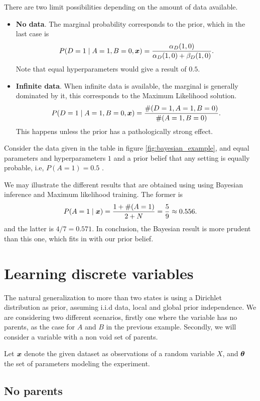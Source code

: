 There are two limit possibilities depending on the amount of data available.
\begin{itemize}
  \item \textbf{No data}. The marginal probability corresponds to the prior, which
in the last case is
    \[
    P(D = 1 \mid A = 1, B = 0, \bm{x}) = \frac{\alpha_{D}(1,0)}{\alpha_{D}(1,0) + \beta_{D}(1,0)}.
    \]
    Note that equal hyperparameters would give a result of \(0.5\).\newline
   
  \item \textbf{Infinite data}. When infinite data is available, the marginal is generally dominated by it,
    this corresponds to the Maximum Likelihood solution.
    \[
    P(D = 1 \mid A = 1, B = 0, \bm{x}) = \frac{\#(D = 1, A = 1 , B = 0)}{\#(A = 1, B = 0)}.
    \]
    This happens unless the prior has a pathologically strong effect.
\end{itemize}

 Consider the data given in the table in figure \ref{fig:bayesian_example}, and
 equal parameters and hyperparameters \(1\) and a prior belief that any setting is equally probable, i.e, \( P(A=1) = 0.5\) . 
 
 We may illustrate the different results that are obtained using using Bayesian inference and Maximum likelihood training. The former is
 \[
   P(A = 1 \mid \bm{x}) = \frac{1 + \#(A = 1)}{2 + N} = \frac{5}{9} \approx 0.556.
 \]
 and the latter is \(4/7 = 0.571\). In conclusion, the Bayesian
 result is more prudent than this one, which fits in with our prior belief.

 \section{Learning discrete variables}

 The natural generalization to more than two states is using a Dirichlet
 distribution as prior, assuming i.i.d data, local and global prior
 independence. We are considering two different scenarios, firstly one where the
 variable has no parents, as the case for \(A\) and \(B\) in the previous
 example. Secondly, we will consider a variable with a non void set of parents.

 Let \(\bm{x}\) denote the given dataset as observations of a random variable \(X\), and \(\bm{\theta}\) the set of parameters modeling the experiment.

 \subsection{No parents}

